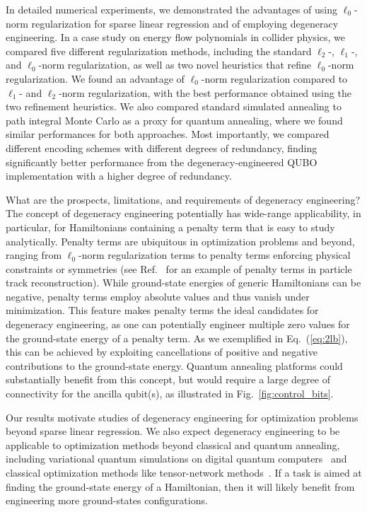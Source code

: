 \documentclass[aps,prd,twocolumn, superscriptaddress,preprintnumbers, nofootinbib,longbibliography,floatfix]{revtex4-2}
\DeclareRobustCommand{\Fig}[1]{Fig.~\ref{#1}}
\DeclareRobustCommand{\Eq}[1]{Eq.~(\ref{#1})}
\DeclareRobustCommand{\Ref}[1]{Ref.~\cite{#1}}
\begin{document}
In detailed numerical experiments, we demonstrated the advantages of using $\ell_0$-norm regularization for sparse linear regression and of employing degeneracy engineering.
%
In a case study on energy flow polynomials in collider physics, we compared five different regularization methods, including the standard $\ell_2$-, $\ell_1$-, and $\ell_0$-norm regularization, as well as two novel heuristics that refine $\ell_0$-norm regularization.
%
We found an advantage of $\ell_0$-norm regularization compared to $\ell_1$- and $\ell_2$-norm regularization, with the best performance obtained using the two refinement heuristics.
%
We also compared standard simulated annealing to path integral Monte Carlo as a proxy for quantum annealing, where we found similar performances for both approaches.
%
Most importantly, we compared different encoding schemes with different degrees of redundancy, finding significantly better performance from the degeneracy-engineered QUBO implementation with a higher degree of redundancy. 


What are the prospects, limitations, and requirements of degeneracy engineering?
% 
The concept of degeneracy engineering potentially has wide-range applicability, in particular, for Hamiltonians containing a penalty term that is easy to study analytically.
%
Penalty terms are ubiquitous in optimization problems and beyond, ranging from $\ell_0$-norm regularization terms to penalty terms enforcing physical constraints or symmetries (see \Ref{Gray:2021bkw} for an example of penalty terms in particle track reconstruction).
%
While ground-state energies of generic Hamiltonians can be negative, penalty terms employ absolute values and thus vanish under minimization.
%
This feature makes penalty terms the ideal candidates for degeneracy engineering, as one can potentially engineer multiple zero values for the ground-state energy of a penalty term.
%
As we exemplified in \Eq{eq:2lb}, this can be achieved by exploiting cancellations of positive and negative contributions to the ground-state energy.
%
Quantum annealing platforms could substantially benefit from this concept, but would require a large degree of connectivity for the ancilla qubit(s), as illustrated in \Fig{fig:control_bits}.  


Our results motivate studies of degeneracy engineering for optimization problems beyond sparse linear regression.
%
We also expect degeneracy engineering to be applicable to optimization methods beyond classical and quantum annealing, including variational quantum simulations on digital quantum computers~\cite{Peruzzo2014, McClean:2016} and classical optimization methods like tensor-network methods~\cite{Orus:2018dya}.
%
If a task is aimed at finding the ground-state energy of a Hamiltonian, then it will likely benefit from engineering more ground-states configurations.
\end{document}
